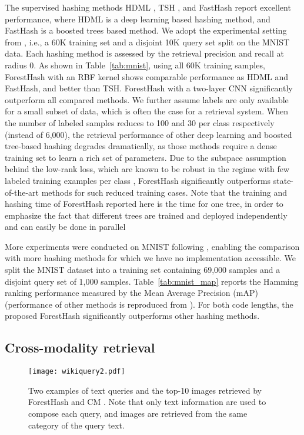 \documentclass[runningheads]{llncs}
\begin{document}
The supervised hashing methods HDML \cite{HDML}, TSH \cite{tsh}, and FastHash
\cite{fasthash} report excellent performance, where HDML is a deep learning
based hashing method, and FastHash is a boosted trees based method.  We adopt
the experimental setting from \cite{HDML}, i.e., a 60K training set and a
disjoint 10K query set split on the MNIST data.  Each hashing method is assessed
by the retrieval precision and recall at radius 0.  As shown in
Table~\ref{tab:mnist}, using all 60K training samples, ForestHash with an RBF
kernel shows comparable performance as HDML and FastHash, and better than
TSH. ForestHash with a two-layer CNN significantly outperform all compared
methods.  We further assume labels are only available for a small subset of
data, which is often the case for a retrieval system. When the number of labeled
samples reduces to 100 and 30 per class respectively (instead of 6,000), the
retrieval performance of other deep learning and boosted tree-based hashing
degrades dramatically, as those methods require a dense training set to learn a
rich set of parameters.  Due to the subspace assumption behind the low-rank
loss, which are known to be robust in the regime with few labeled training
examples per class \cite{revlearn}, ForestHash significantly outperforms
state-of-the-art methods for such reduced training cases.  Note that the
training and hashing time of ForestHash reported here is the time for one tree,
in order to emphasize the fact that different trees are trained and deployed
independently and can easily be done in parallel

More experiments were conducted on MNIST following \cite{AGH}, enabling the
comparison with more hashing methods for which we have no implementation
accessible. We split the MNIST dataset into a training set containing 69,000
samples and a disjoint query set of 1,000 samples. Table~\ref{tab:mnist_map}
reports the Hamming ranking performance measured by the Mean Average Precision
(mAP) (performance of other methods is reproduced from \cite{AGH}).  For both
code lengths, the proposed ForestHash significantly outperforms other hashing
methods.


\subsection{Cross-modality retrieval}

\begin{figure}[t]
\centering
 \texttt{[image: wikiquery2.pdf]}
\caption{Two examples of text queries and the top-10 images retrieved by
  ForestHash and CM \cite{wikixmod}.  Note that only text information are used
  to compose each query, and images are retrieved from the same category of the
  query text.  }
\label{fig:wiki}
\end{figure}
\end{document}
